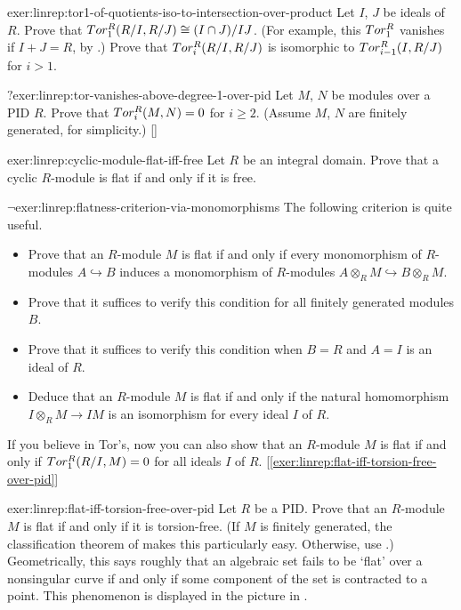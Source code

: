 \begin{exer}{}{exer:linrep:tor1-of-quotients-iso-to-intersection-over-product}
  Let $I$, $J$ be ideals of $R$. Prove that
  $Tor^R_1(R/I, R/J) \cong (I \cap J)/IJ$. (For example, this
  $Tor^R_1$ vanishes if $I + J = R$, by
  .)
  Prove
  that $Tor^R_i(R/I, R/J)$ is isomorphic to $Tor^R_{i-1}(I, R/J)$
  for $i > 1$.
\end{exer}
\begin{exer}{$?$}{exer:linrep:tor-vanishes-above-degree-1-over-pid}
  Let $M$, $N$ be modules over a PID $R$. Prove that
  $Tor^R_i(M, N) = 0$ for $i \geq 2$. (Assume $M$, $N$ are finitely
  generated, for simplicity.)
  []
\end{exer}
\begin{exer}{}{exer:linrep:cyclic-module-flat-iff-free}
  Let $R$ be an integral domain. Prove that a cyclic $R$-module is
  flat if and only if it is free.
\end{exer}
\begin{exer}{$\lnot$}{exer:linrep:flatness-criterion-via-monomorphisms}
  The following criterion is quite useful.
  \begin{itemize}
  \item Prove that an $R$-module $M$ is flat if and only if every
    monomorphism of $R$-modules $A \hookrightarrow B$ induces a
    monomorphism of $R$-modules
    $A \otimes_R M \hookrightarrow B \otimes_R M$.
  \item Prove that it suffices to verify this condition for all
    finitely generated modules $B$.
  \item Prove that it suffices to verify this condition when $B = R$
    and $A = I$ is an ideal of $R$.
  \item Deduce that an $R$-module $M$ is flat if and only if the
    natural homomorphism $I \otimes_R M \to IM$ is an isomorphism for
    every ideal $I$ of $R$.
  \end{itemize}
  If you believe in Tor's, now you can also show that an $R$-module
  $M$ is flat if and only if $Tor^R_1(R/I, M) = 0$ for all ideals $I$
  of $R$. [\ref{exer:linrep:flat-iff-torsion-free-over-pid}]
\end{exer}
\begin{exer}{}{exer:linrep:flat-iff-torsion-free-over-pid}
  Let $R$ be a PID. Prove that an $R$-module $M$ is flat if and only
  if it is torsion-free. (If $M$ is finitely generated, the
  classification theorem of
   makes this
  particularly easy.  Otherwise, use
  .)
  Geometrically, this says roughly that an algebraic set fails to be
  `flat' over a nonsingular curve if and only if some component of the
  set is contracted to a point. This phenomenon is displayed in the
  picture in .
\end{exer}

